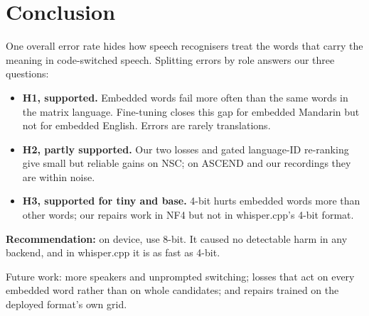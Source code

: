 \section{Conclusion}
\label{sec:conclusion}

One overall error rate hides how speech recognisers treat the words that carry the meaning in code-switched speech. Splitting errors by role answers our three questions:
\begin{itemize}
  \item \textbf{H1, supported.} Embedded words fail more often than the same words in the matrix language. Fine-tuning closes this gap for embedded Mandarin but not for embedded English. Errors are rarely translations.
  \item \textbf{H2, partly supported.} Our two losses and gated language-ID re-ranking give small but reliable gains on NSC; on ASCEND and our recordings they are within noise.
  \item \textbf{H3, supported for tiny and base.} 4-bit hurts embedded words more than other words; our repairs work in NF4 but not in whisper.cpp's 4-bit format.
\end{itemize}
\textbf{Recommendation:} on device, use 8-bit. It caused no detectable harm in any backend, and in whisper.cpp it is as fast as 4-bit.

Future work: more speakers and unprompted switching; losses that act on every embedded word rather than on whole candidates; and repairs trained on the deployed format's own grid.

